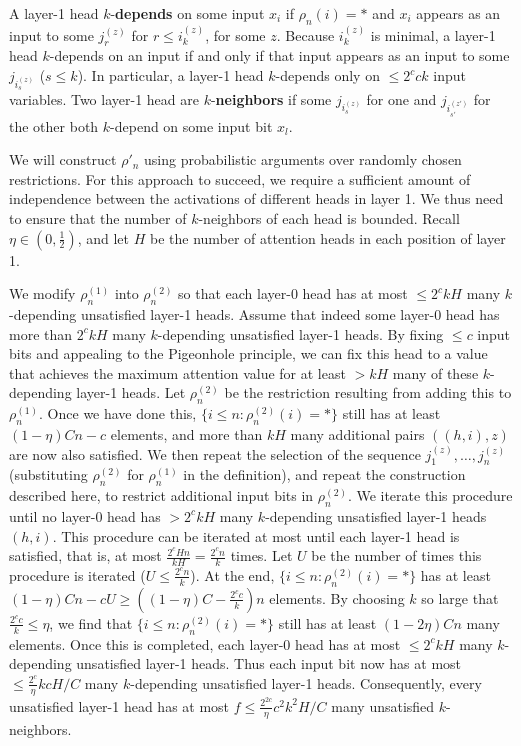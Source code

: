 \documentclass[11pt,a4paper]{article}
\begin{document}
A layer-1 head $k$-\textbf{depends} on some input $x_i$ if $\rho_n(i) = *$ and $x_i$ appears as an input to some $j_r^{(z)}$ for $r \leq i_k^{(z)}$, for some $z$.
Because $i_k^{(z)}$ is minimal, a layer-1 head $k$-depends on an input if and only if that input appears as an input to some $j_{i_s^{(z)}}$ ($s \leq k$).
In particular, a layer-1 head $k$-depends only on $\leq 2^c ck$ input variables.
Two layer-1 head are $k$-\textbf{neighbors} if some $j_{i_s^{(z)}}$ for one and $j_{i_{s'}^{(z')}}$ for the other both $k$-depend on some input bit $x_l$.

We will construct $\rho'_n$ using probabilistic arguments over randomly chosen restrictions.
For this approach to succeed, we require a  sufficient amount of independence between the activations of different heads in layer 1.
We thus need to ensure that the number of $k$-neighbors of each head is bounded.
Recall $\eta \in (0,\frac{1}{2})$, and let $H$ be the number of attention heads in each position of layer 1.



We modify $\rho^{(1)}_n$ into $\rho^{(2)}_n$ so that each layer-0 head has at most $\leq 2^c kH$ many $k$-depending unsatisfied layer-1 heads.
Assume that indeed some layer-0 head  has more than $2^c kH$ many $k$-depending unsatisfied layer-1 heads. %
By fixing $\leq c$ input bits and appealing to the Pigeonhole principle, we can fix this head to a value that achieves the maximum attention value for at least $> kH$ many of these $k$-depending layer-1 heads.
Let $\rho^{(2)}_n$ be the restriction resulting from adding this to $\rho^{(1)}_n$.
Once we have done this, 
$\{i \leq n: \rho_n^{(2)}(i) = *\}$ still has at least $(1-\eta) C n - c$ elements, and more than $kH$ many additional pairs $((h,i),z)$ are now also satisfied.
We then repeat the selection of the sequence $j_1^{(z)}, \dots, j_n^{(z)}$ (substituting $\rho^{(2)}_n$ for $\rho^{(1)}_n$ in the definition), and repeat the construction described here, to restrict additional input bits in $\rho^{(2)}_n$.
We iterate this procedure until no layer-0 head has $>  2^c kH$ many $k$-depending unsatisfied layer-1 heads $(h,i)$. %
This procedure can be iterated at most until each layer-1 head is satisfied, that is, at most $\frac{2^c H n}{kH} = \frac{2^c n}{k}$ times.
Let $U$ be the number of times this procedure is iterated ($U \leq \frac{2^c n}{k}$).
At the end, $\{i \leq n: \rho_n^{(2)}(i) = *\}$ has at least $(1-\eta) C n - cU \geq \left((1-\eta) C  - \frac{2^c c}{k}\right) n$ elements.
By choosing $k$ so large that $\frac{2^c c}{k} \leq \eta$, we find that $\{i \leq n: \rho^{(2)}_n(i) = *\}$  still has at least $(1-2\eta) C n$ many elements.
Once this is completed, each layer-0 head has at most $\leq 2^c kH$ many $k$-depending unsatisfied layer-1 heads.
Thus each input bit now has at most $\leq \frac{2^c}{\eta}kcH/C$ many $k$-depending unsatisfied layer-1 heads.
Consequently, every unsatisfied layer-1 head has at most $f \leq \frac{2^{2c}}{\eta}c^2k^2H/C$ many unsatisfied $k$-neighbors.
\end{document}
